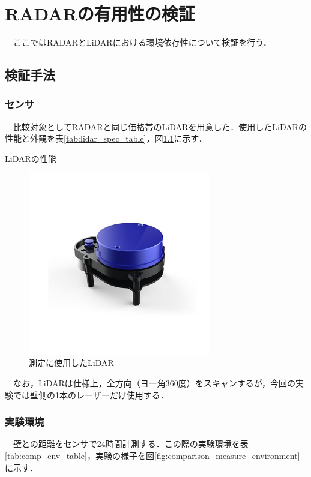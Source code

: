 \appendix
\chapter{RADARの有用性の検証}
　ここではRADARとLiDARにおける環境依存性について検証を行う．

\section{検証手法}
\subsection{センサ}
　比較対象としてRADARと同じ価格帯のLiDARを用意した．使用したLiDARの性能と外観を表\ref{tab:lidar_spec_table}，図\ref{fig:lidar}に示す．\cite{lidar_datasheet}

\begin{table}[htbp]
    \centering
    \caption{LiDARの性能}
    
    \label{tab:lidar_spec_table}
\end{table}

\begin{figure}[H]
    \centering
    \includegraphics[width=8cm]{./fig/lidar.jpg}
    \caption{測定に使用したLiDAR}
    \label{fig:lidar}
\end{figure}
　なお，LiDARは仕様上，全方向（ヨー角360度）をスキャンするが，今回の実験では壁側の1本のレーザーだけ使用する．

\subsection{実験環境}
　壁との距離をセンサで24時間計測する．この際の実験環境を表\ref{tab:comp_env_table}，実験の様子を図\ref{fig:comparison_measure_environment}に示す．

